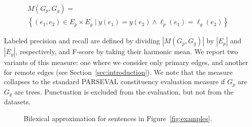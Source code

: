 \documentclass[11pt,a4paper]{article}
\newcommand{\secref}[1]{Section~\ref{#1}}
\newcommand{\figref}[1]{Figure~\ref{#1}}
\begin{document}
\vspace{-.6cm}

{\small
\begin{multline*}
    M(G_p,G_g) = \\
    \left\{(e_1,e_2) \in E_p \times E_g \;|\;
    y(e_1) = y(e_2) \wedge \ell_p(e_1)=\ell_g(e_2)\right\}
\end{multline*}
}

\vspace{-.6cm}

Labeled precision and recall are defined by dividing $|M(G_p,G_g)|$ by $|E_p|$ and $|E_g|$, respectively,
and F-score by taking their harmonic mean.
We report two variants of this measure: one where we consider only primary edges,
and another for remote edges (see \secref{sec:introduction}).
We note that the measure collapses to the standard
PARSEVAL constituency evaluation measure if $G_p$ are $G_g$ are trees.
Punctuation is excluded from the evaluation, but not from the datasets.

\begin{figure}
\centering
{}
\caption{Bilexical approximation for sentences in \figref{fig:examples}.}
\label{fig:bilexical_example}
\end{figure}
\end{document}

